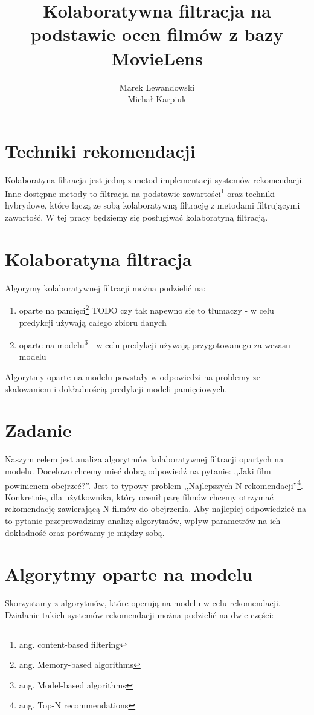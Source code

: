 \documentclass[12pt, a4paper]{article}
\title{\textbf{Kolaboratywna filtracja na podstawie ocen filmów z bazy MovieLens}}
\author{Marek Lewandowski \\ Michał Karpiuk}
\date{}
\begin{document}
\maketitle

\section{Techniki rekomendacji}
Kolaboratyna filtracja jest jedną z metod implementacji systemów rekomendacji. Inne dostępne metody to filtracja na podstawie zawartości\footnote{ang. content-based filtering} oraz techniki hybrydowe, które łączą ze sobą kolaboratywną filtrację z metodami filtrującymi zawartość. W tej pracy będziemy się posługiwać kolaboratyną filtracją.

\section{Kolaboratyna filtracja}
Algorymy kolaboratywnej filtracji można podzielić na:

\begin{enumerate} 
\item oparte na pamięci\footnote{ang. Memory-based algorithms} TODO czy tak napewno się to tłumaczy - w celu predykcji używają całego zbioru danych
\item oparte na modelu\footnote{ang. Model-based algorithms} - w celu predykcji używają przygotowanego za wczasu modelu
\end{enumerate}

Algorytmy oparte na modelu powstały w odpowiedzi na problemy ze skalowaniem i dokładnością predykcji modeli pamięciowych.

\section{Zadanie}
Naszym celem jest analiza algorytmów kolaboratywnej filtracji opartych na modelu. Docelowo chcemy mieć dobrą odpowiedź na pytanie: ,,Jaki film powinienem obejrzeć?''. Jest to typowy problem ,,Najlepszych N rekomendacji''\footnote{ang. Top-N recommendations}. Konkretnie, dla użytkownika, który ocenił parę filmów chcemy otrzymać rekomendację zawierającą N filmów do obejrzenia. Aby najlepiej odpowiedzieć na to pytanie przeprowadzimy analizę algorytmów, wpływ parametrów na ich dokładność oraz porówamy je między sobą.

\section{Algorytmy oparte na modelu}
Skorzystamy z algorytmów, które operują na modelu w celu rekomendacji. Działanie takich systemów rekomendacji można podzielić na dwie części:
\end{document}
